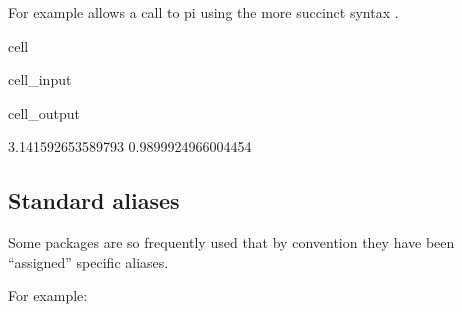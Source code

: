 \documentclass[letterpaper,10pt,english]{jupyterBook}
\begin{document}
\sphinxAtStartPar
For example   allows a call to pi using the more succinct syntax .

\begin{sphinxuseclass}{cell}\begin{sphinxVerbatimInput}

\begin{sphinxuseclass}{cell_input}
\begin{sphinxVerbatim}[commandchars=\\\{\}]
   
\end{sphinxVerbatim}

\end{sphinxuseclass}\end{sphinxVerbatimInput}
\begin{sphinxVerbatimOutput}

\begin{sphinxuseclass}{cell_output}
\begin{sphinxVerbatim}[commandchars=\\\{\}]
3.141592653589793
\PYGZhy{}0.9899924966004454
\end{sphinxVerbatim}

\end{sphinxuseclass}\end{sphinxVerbatimOutput}

\end{sphinxuseclass}

\subsection{Standard aliases}
\label{\detokenize{content/04_PythonEssentials/PythonPandasDataframes:standard-aliases}}
\sphinxAtStartPar
Some packages are so frequently used that by convention they have been “assigned” specific aliases.

\sphinxAtStartPar
For example:

\sphinxAtStartPar
{}
\end{document}

